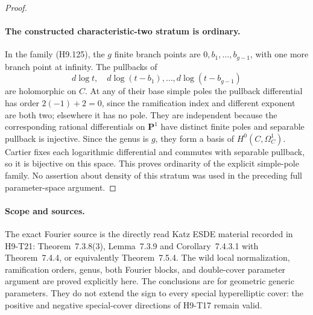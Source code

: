 \begin{proof}
\paragraph{The constructed characteristic-two stratum is ordinary.}
In the family (H9.125), the $g$ finite branch
points are $0,b_1,\ldots,b_{g-1}$, with one
more branch point at infinity. The pullbacks
of
\[
       d\log t,\quad d\log(t-b_1),\ldots,
                                      d\log(t-b_{g-1})
\]
are holomorphic on $C$. At any of their base
simple poles the pullback differential has
order $2(-1)+2=0$, since the ramification
index and different exponent are both two;
elsewhere it has no pole. They are independent
because the corresponding rational
differentials on $\mathbf P^1$ have distinct
finite poles and separable pullback is
injective. Since the genus is $g$, they form
a basis of $H^0(C,\Omega_C^1)$. Cartier
fixes each logarithmic differential and
commutes with separable pullback, so it is
bijective on this space. This proves
ordinarity of the explicit simple-pole
family. No assertion about density of this
stratum was used in the preceding full
parameter-space argument.
\end{proof}

\paragraph{Scope and sources.}
The exact Fourier source is the directly read
Katz ESDE material recorded in H9-T21:
Theorem~7.3.8(3), Lemma~7.3.9 and
Corollary~7.4.3.1 with Theorem~7.4.4, or
equivalently Theorem~7.5.4. The wild local
normalization, ramification orders, genus,
both Fourier blocks, and double-cover
parameter argument are proved explicitly
here. The conclusions are for geometric
generic parameters. They do not extend the
sign to every special hyperelliptic cover:
the positive and negative special-cover
directions of H9-T17 remain valid.

